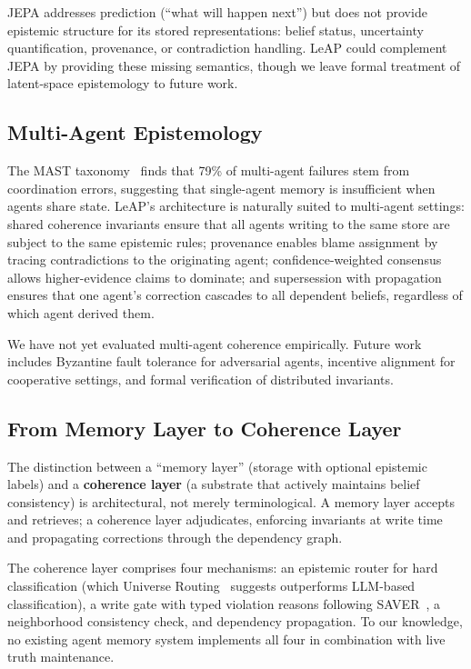 \documentclass[11pt,letterpaper]{article}
\begin{document}
JEPA addresses prediction (``what will happen next'') but does not provide epistemic structure for its stored representations: belief status, uncertainty quantification, provenance, or contradiction handling. LeAP could complement JEPA by providing these missing semantics, though we leave formal treatment of latent-space epistemology to future work.

\subsection{Multi-Agent Epistemology}

The MAST taxonomy~\cite{mast2025} finds that 79\% of multi-agent failures stem from coordination errors, suggesting that single-agent memory is insufficient when agents share state. LeAP's architecture is naturally suited to multi-agent settings: shared coherence invariants ensure that all agents writing to the same store are subject to the same epistemic rules; provenance enables blame assignment by tracing contradictions to the originating agent; confidence-weighted consensus allows higher-evidence claims to dominate; and supersession with propagation ensures that one agent's correction cascades to all dependent beliefs, regardless of which agent derived them.

We have not yet evaluated multi-agent coherence empirically. Future work includes Byzantine fault tolerance for adversarial agents, incentive alignment for cooperative settings, and formal verification of distributed invariants.

\subsection{From Memory Layer to Coherence Layer}

The distinction between a ``memory layer'' (storage with optional epistemic labels) and a \textbf{coherence layer} (a substrate that actively maintains belief consistency) is architectural, not merely terminological. A memory layer accepts and retrieves; a coherence layer adjudicates, enforcing invariants at write time and propagating corrections through the dependency graph.

The coherence layer comprises four mechanisms: an epistemic router for hard classification (which Universe Routing~\cite{universe2026} suggests outperforms LLM-based classification), a write gate with typed violation reasons following SAVER~\cite{yuan2026saver}, a neighborhood consistency check, and dependency propagation. To our knowledge, no existing agent memory system implements all four in combination with live truth maintenance.
\end{document}
